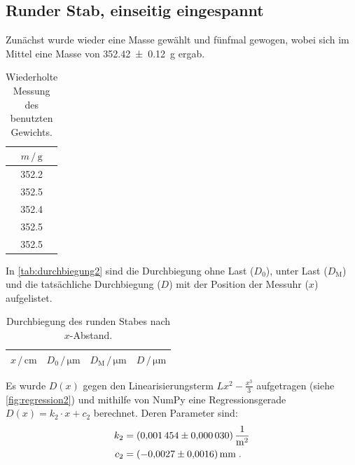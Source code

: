 \subsection{Runder Stab, einseitig eingespannt} \label{sec:auswertung_einseitig_rund}
Zunächst wurde wieder eine Masse gewählt und fünfmal gewogen,
wobei sich im Mittel eine Masse von \SI{352.42 \pm 0.12}{\gram} ergab.

\begin{table}
\centering
\caption{Wiederholte Messung des benutzten Gewichts.}
\begin{tabular}{c}
\toprule
$m \,/\, \si{\gram}$ \\
\midrule
\num{352.2} \\
\num{352.5} \\
\num{352.4} \\
\num{352.5} \\
\num{352.5} \\
\bottomrule
\end{tabular}
\end{table}


In \autoref{tab:durchbiegung2} sind die Durchbiegung ohne Last ($D_\text{0}$), unter Last ($D_\text{M}$) und die tatsächliche Durchbiegung ($D$) mit der Position der Messuhr ($x$) aufgelistet.

\begin{table}
\centering
\caption{Durchbiegung des runden Stabes nach $x$-Abstand.}
\label{tab:durchbiegung2}
\begin{tabular}{c c c c}
\toprule
$x \,/\, \si{\centi\meter}$ &
$D_0 \,/\, \si{\micro\meter}$ &
$D_\text{M} \,/\, \si{\micro\meter}$ &
$D \,/\, \si{\micro\meter}$ \\
\midrule

\bottomrule
\end{tabular}
\end{table}

\FloatBarrier

Es wurde $D(x)$ gegen den Linearisierungsterm $Lx^2-\frac{x^3}{3}$ aufgetragen (siehe \autoref{fig:regression2})
und mithilfe von NumPy eine Regressionsgerade $D(x) = k_2 \cdot x + c_2$ berechnet.
Deren Parameter sind:
\begin{align*}
  k_2 &= \SI{0.001454 \pm 0.000030}{\meter\tothe{-2}} \\
  c_2 &= \SI{-0.0027 \pm 0.0016}{\milli\meter} \; .
\end{align*}

